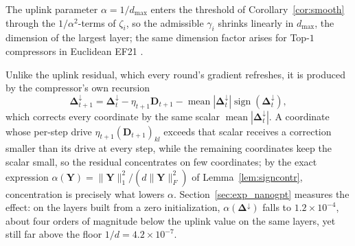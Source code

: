 \begin{remark}\label{rem:dimension}
The uplink parameter $\alpha = 1/d_{\max}$ enters the threshold of Corollary~\ref{cor:smooth} through the $1/\alpha^2$-terms of $\zeta_i$, so the admissible $\gamma_i$ shrinks linearly in $d_{\max}$, the dimension of the largest layer; the same dimension factor arises for Top-$1$ compressors in Euclidean EF21 \citep{richtarik2021ef21}. 

 Unlike the uplink residual, which every round's gradient refreshes, it is produced by the compressor's own recursion
\begin{equation*}
\boldsymbol{\Delta}_{t+1}^{\downarrow} = \boldsymbol{\Delta}_t^{\downarrow} - \eta_{t+1} \mathbf{D}_{t+1} - \operatorname{mean}|\boldsymbol{\Delta}_t^{\downarrow}|\operatorname{sign}(\boldsymbol{\Delta}_t^{\downarrow}),
\end{equation*}
which corrects every coordinate by the same scalar $\operatorname{mean}|\boldsymbol{\Delta}_t^{\downarrow}|$. A coordinate whose per-step drive $\eta_{t+1}(\mathbf{D}_{t+1})_{kl}$ exceeds that scalar receives a correction smaller than its drive at every step, while the remaining coordinates keep the scalar small, so the residual concentrates on few coordinates; by the exact expression $\alpha(\mathbf{Y}) = \|\mathbf{Y}\|_1^2/(d\|\mathbf{Y}\|_F^2)$ of Lemma~\ref{lem:signcontr}, concentration is precisely what lowers $\alpha$. Section~\ref{sec:exp_nanogpt} measures the effect: on the layers built from a zero initialization, $\alpha(\boldsymbol{\Delta}^{\downarrow})$ falls to $1.2\times10^{-4}$, about four orders of magnitude below the uplink value on the same layers, yet still far above the floor $1/d = 4.2\times10^{-7}$.
\end{remark}


